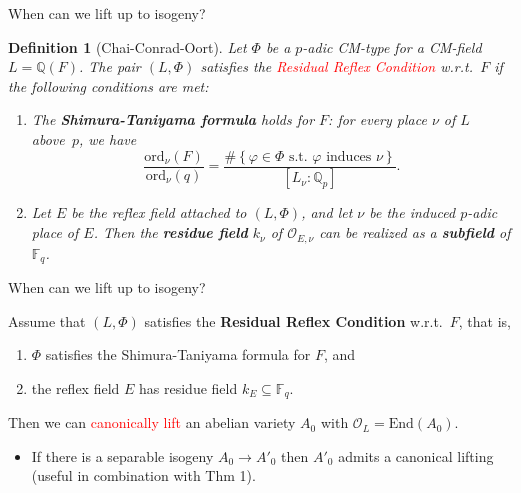 \documentclass[usenames,dvipsnames]{beamer}
\def\Q{\mathbb{Q}}
\def\F{\mathbb{F}}
\newcommand{\cO}{{\mathcal O}}
\newcommand{\vphi}{\varphi}
\newcommand{\set}[1]{\left\lbrace#1\right\rbrace }
\newcommand{\red}[1]{\textcolor{red}{#1}}
\newtheorem{df}{Definition}[section]
\begin{document}
\begin{frame}{ When can we lift up to isogeny? }
	\begin{df}[Chai-Conrad-Oort]
		Let $\Phi$ be a $p$-adic CM-type for a CM-field $L=\Q(F)$.
		\pause The pair $(L,\Phi)$ satisfies the \red{Residual Reflex Condition} w.r.t.~$F$ 
		if the following conditions are met:
		\begin{enumerate}[1.]
			\pause \item \label{def:RRC_item_st} The {\bf Shimura-Taniyama formula} holds for $F$: for every  place $\nu$ of $L$ above~$p$, we have
			\begin{equation*}
			\dfrac{ \mathrm{ord}_\nu(F)}{ \mathrm{ord}_\nu(q)}=\dfrac{\#\set{ \vphi \in \Phi \text{ s.t.~} \vphi \text{ induces } \nu }}{[L_\nu:\Q_p]}.
			\end{equation*}
			\pause \item \label{def:RRC_item_refl} Let $E$ be the reflex field attached to $(L,\Phi)$, and let $\nu$ be the induced $p$-adic place of $E$. Then the {\bf residue field} $k_\nu$ of $\cO_{E,\nu}$
			can be realized as a {\bf subfield} of $\F_q$.
		\end{enumerate}
	\end{df}
\end{frame}

\begin{frame}{ When can we lift up to isogeny?  }
	\begin{theorem}
    Assume that $(L,\Phi)$ satisfies the {\bf Residual Reflex Condition} w.r.t.~$F$, that is,\\
    \begin{enumerate}
    \item $\Phi$ satisfies the {Shimura-Taniyama} formula for $F$, and
    \item the reflex field $E$ has residue field {$k_E\subseteq \F_q$}.
    \end{enumerate}  
\pause 
    Then we can \red{canonically lift} an abelian variety $A_0$ with $\mathcal{O}_L = \mathrm{End}(A_0)$.
	\end{theorem}
	\begin{itemize}
\pause
    \item If there is a separable isogeny $A_0\to A'_0$ then $A'_0$ admits a canonical lifting (useful in combination with Thm 1).
	\end{itemize}
\end{frame}
\end{document}
